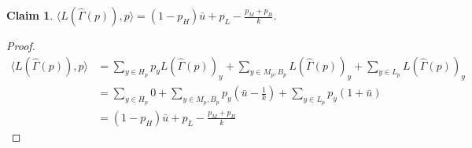 \documentclass[12pt]{article}
\newcommand{\inprod}[2]{\langle #1, #2 \rangle}%
\newtheorem{claim}{Claim}
\begin{document}
\begin{claim}
	$\inprod{L(\hat \Gamma(p))}{p} = (1-p_H) \bar u + p_L - \frac{p_M + p_B}{k}$. 
\end{claim}
\begin{proof}
	\begin{align*}
	\inprod{L(\hat \Gamma(p))}{p} &=
	\sum_{y \in H_p} p_y L(\hat \Gamma(p))_y + \sum_{y \in M_p, B_p} L(\hat \Gamma(p))_y + \sum_{y \in L_p}L(\hat \Gamma(p))_y \\
	&= \sum_{y \in H_p} 0 + \sum_{y \in M_p, B_p} p_y(\bar u - \frac{1}{k}) + \sum_{y \in L_p} p_y(1 + \bar u) \\
	&= (1-p_H) \bar u + p_L - \frac{p_M + p_B}{k}
	\end{align*}
\end{proof}
\end{document}
